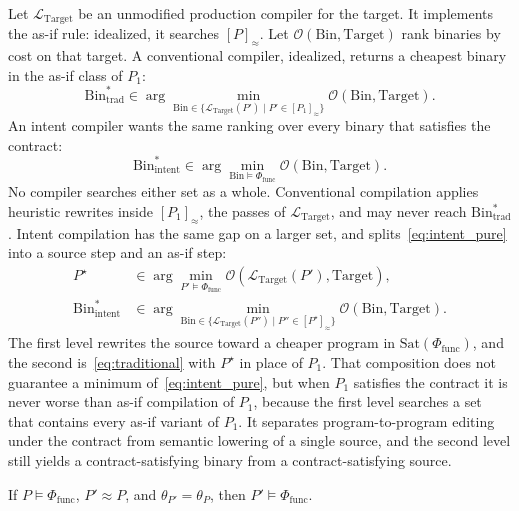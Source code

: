 Let \(\mathcal{L}_{\text{Target}}\) be an unmodified production compiler for
the target. It implements the as-if rule: idealized, it searches
\([P]_\approx\). Let \(\mathcal{O}(\mathrm{Bin}, \text{Target})\) rank
binaries by cost on that target. A conventional compiler, idealized,
returns a cheapest binary in the as-if class of \(P_1\):
\begin{equation}
\label{eq:traditional}
\mathrm{Bin}^*_{\text{trad}} \in
\arg\min_{\mathrm{Bin} \in \{\mathcal{L}_{\text{Target}}(P') \mid
P' \in [P_1]_\approx\}}
\mathcal{O}(\mathrm{Bin}, \text{Target}).
\end{equation}
An intent compiler wants the same ranking over every binary that
satisfies the contract:
\begin{equation}
\label{eq:intent_pure}
\mathrm{Bin}^*_{\text{intent}} \in
\arg\min_{\mathrm{Bin} \models \Phi_{\text{func}}}
\mathcal{O}(\mathrm{Bin}, \text{Target}).
\end{equation}
No compiler searches either set as a whole. Conventional compilation
applies heuristic rewrites inside \([P_1]_\approx\), the passes of
\(\mathcal{L}_{\text{Target}}\), and may never reach
\(\mathrm{Bin}^*_{\text{trad}}\). Intent compilation has the same gap on a
larger set, and splits~\eqref{eq:intent_pure} into a source step and an
as-if step:
\begin{align}
\label{eq:intent_source}
P^\star &\in \arg\min_{P' \models \Phi_{\text{func}}}
\mathcal{O}(\mathcal{L}_{\text{Target}}(P'), \text{Target}), \\
\label{eq:intent_lower}
\mathrm{Bin}^*_{\text{intent}} &\in
\arg\min_{\mathrm{Bin} \in \{\mathcal{L}_{\text{Target}}(P'') \mid
P'' \in [P^\star]_\approx\}}
\mathcal{O}(\mathrm{Bin}, \text{Target}).
\end{align}
The first level rewrites the source toward a cheaper program in
\(\mathrm{Sat}(\Phi_{\text{func}})\), and the second is~\eqref{eq:traditional}
with \(P^\star\) in place of \(P_1\). That composition does not guarantee a
minimum of~\eqref{eq:intent_pure}, but when \(P_1\) satisfies the contract it
is never worse than as-if compilation of \(P_1\), because the first level
searches a set that contains every as-if variant of \(P_1\). It separates
program-to-program editing under the contract from semantic lowering of a
single source, and the second level still yields a contract-satisfying
binary from a contract-satisfying source.

\begin{proposition}
\label{prop:refine}
If \(P \models \Phi_{\text{func}}\), \(P' \approx P\), and
\(\theta_{P'} = \theta_P\), then \(P' \models \Phi_{\text{func}}\).
\end{proposition}

